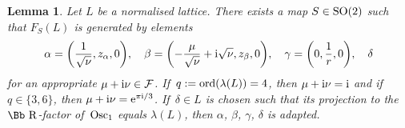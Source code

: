 \documentclass[pdftex]{sigma}
\newcommand\RR{{\mbox{\Bb R}}}
\newcommand\cF{{\mathcal F}}
\newcommand{\SO}{\mathop{{\rm SO}}}
\newcommand{\Osc}{{\rm Osc}}
\newcommand{\ord}{{\rm ord}}
\numberwithin{equation}{section}
\newtheorem{Lemma}[Theorem]{Lemma}
\begin{document}
\begin{Lemma} \label{lm:generatorChoice}
Let $L$ be a normalised lattice. There exists a map $S\in\SO(2)$ such that $F_S(L)$ is generated by elements
\begin{gather}\label{eq:generators'}
\alpha=\bigg(\frac 1{\sqrt\nu},z_\alpha,0\bigg),\quad
\beta=\bigg({-}\frac{\mu}{\sqrt\nu}+{\rm i}\sqrt\nu ,z_\beta,0\bigg),\quad
\gamma=\bigg(0,\frac 1r,0\bigg),\quad \delta
\end{gather}
 for an appropriate $\mu+{\rm i}\nu\in\cF$. If~$q:=\ord(\lambda(L))=4$, then $\mu+{\rm i}\nu={\rm i}$ and if $q\in\{3,6\}$, then $\mu+{\rm i}\nu= {\rm e}^{\pi {\rm i}/3}$. If~$\delta\in L$ is chosen such that its projection to the $\RR$-factor of~$\Osc_1$ equals $\lambda(L)$, then $\alpha$, $\beta$, $\gamma$, $\delta$ is adapted.
\end{Lemma}
\end{document}
